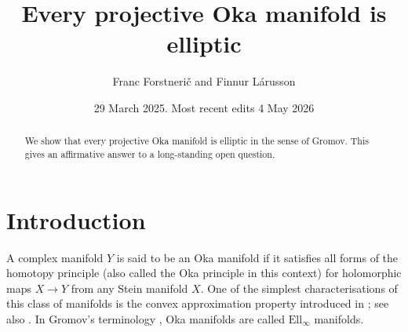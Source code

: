 \documentclass[12pt]{amsart}
\theoremstyle{definition}
\numberwithin{equation}{section}
\numberwithin{figure}{section}
\numberwithin{equation}{section}
\begin{document}
\title{Every projective Oka manifold is elliptic}
\author{Franc Forstneri\v{c} and Finnur L\'arusson}

\address{Franc Forstneri\v c, Faculty of Mathematics and Physics, University of Ljubljana, Jadranska 19, 1000 Ljubljana, Slovenia}

\address{Franc Forstneri\v c, Institute of Mathematics, Physics, and Mechanics, Jadranska 19, 1000 Ljubljana, Slovenia}

\address{Finnur L\'arusson, Discipline of Mathematical Sciences, University of Adelaide, Adelaide SA 5005, Australia}


\date{29 March 2025.  Most recent edits 4 May 2026}


\begin{abstract}
We show that every projective Oka manifold
is elliptic in the sense of Gromov. This gives an affirmative answer
to a long-standing open question.
\end{abstract}

\maketitle



%
%
%
%
\section{Introduction}\label{sec:intro} 

A complex manifold $Y$ is said to be an Oka manifold
if it satisfies all forms of the homotopy principle 
(also called the Oka principle in this context) for holomorphic maps $X\to Y$
from any Stein manifold $X$. One of the simplest characterisations
of this class of manifolds is the convex approximation 
property introduced in \cite{Forstneric2006AM}; see
also \cite[Sect.\ 5.4]{Forstneric2017E}.
In Gromov's terminology \cite[3.1, p.\ 878]{Gromov1989}, 
Oka manifolds are called $\mathrm{Ell}_\infty$ manifolds.
\end{document}
